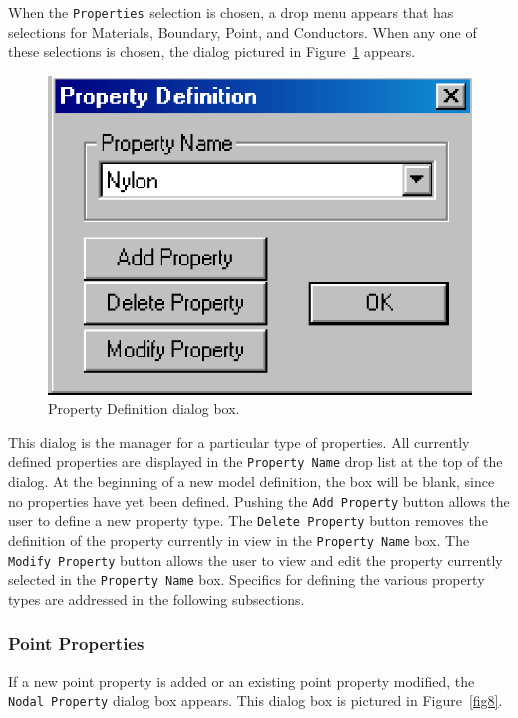 \documentclass[12pt]{report}
\begin{document}
When the \texttt{Properties} selection is chosen, a drop menu
appears that has selections for Materials, Boundary, Point, and
Conductors. When any one of these selections is chosen, the dialog
pictured in Figure~\ref{fig7} appears.

\begin{figure}[htbp]
\centerline{\includegraphics{belaman7.eps}}
\caption{Property Definition dialog box.}
\label{fig7}
\end{figure}




This dialog is the manager for a particular type of properties. All
currently defined properties are displayed in the \texttt{Property
Name} drop list at the top of the dialog. At the beginning of a new
model definition, the box will be blank, since no properties have
yet been defined. Pushing the \texttt{Add Property} button allows
the user to define a new property type. The \texttt{Delete
Property} button removes the definition of the property currently
in view in the \texttt{Property Name} box. The \texttt{Modify
Property} button allows the user to view and edit the property
currently selected in the \texttt{Property Name} box. Specifics for
defining the various property types are addressed in the
following subsections.

\subsubsection{Point Properties}

If a new point property is added or an existing point property modified, the
\texttt{Nodal Property} dialog box appears. This dialog box is pictured in
Figure~\ref{fig8}.
\end{document}
